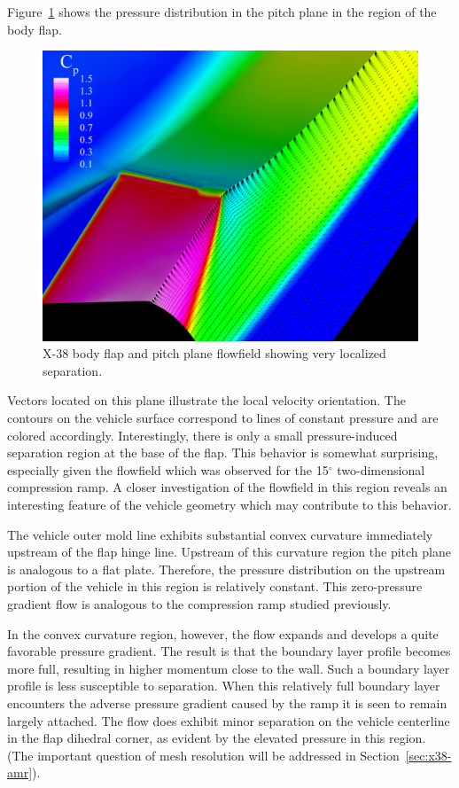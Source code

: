 Figure~\ref{fig:x38_body_flap_cut_vectors} shows the pressure distribution in the pitch plane in the region of the body flap.
\begin{figure}[hbtp]
  \begin{center}
    \includegraphics[width=\textwidth]{figures/x38/bf-vectors}
    \caption{X-38 body flap and pitch plane flowfield showing very localized separation.\label{fig:x38_body_flap_cut_vectors}}
  \end{center}
\end{figure}
Vectors located on this plane illustrate the local velocity orientation.  The contours on the vehicle surface correspond to lines of constant pressure and are colored accordingly.  Interestingly, there is only a small pressure-induced separation region at the base of the flap.  This behavior is somewhat surprising, especially given the flowfield which was observed for the 15$^\circ$ two-dimensional compression ramp.  A closer investigation of the flowfield in this region reveals an interesting feature of the vehicle geometry which may contribute to this behavior.

\clearpage
The vehicle outer mold line exhibits substantial convex curvature immediately upstream of the flap hinge line.  Upstream of this curvature region the pitch plane is analogous to a flat plate.  Therefore, the pressure distribution on the upstream portion of the vehicle in this region is relatively constant.  This zero-pressure gradient flow is analogous to the compression ramp studied previously.

In the convex curvature region, however, the flow expands and develops a quite favorable pressure gradient.  The result is that the boundary layer profile becomes more full, resulting in higher momentum close to the wall.  Such a boundary layer profile is less susceptible to separation.  When this relatively full boundary layer encounters the adverse pressure gradient caused by the ramp it is seen to remain largely attached.  The flow does exhibit minor separation on the vehicle centerline in the flap dihedral corner, as evident by the elevated pressure in this region.  (The important question of mesh resolution will be addressed in Section~\ref{sec:x38-amr}).

